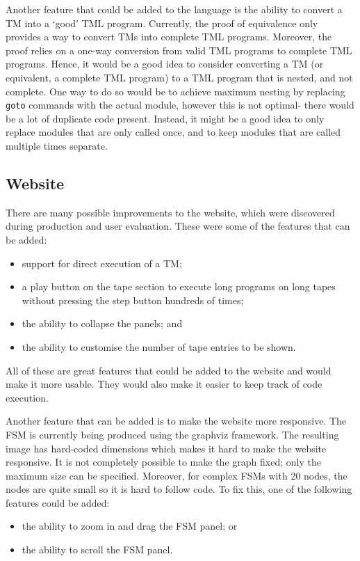 Another feature that could be added to the language is the ability to convert a TM into a `good' TML program. Currently, the proof of equivalence only provides a way to convert TMs into complete TML programs. Moreover, the proof relies on a one-way conversion from valid TML programs to complete TML programs. Hence, it would be a good idea to consider converting a TM (or equivalent, a complete TML program) to a TML program that is nested, and not complete. One way to do so would be to achieve maximum nesting by replacing \texttt{goto} commands with the actual module, however this is not optimal- there would be a lot of duplicate code present. Instead, it might be a good idea to only replace modules that are only called once, and to keep modules that are called multiple times separate. 

 \subsection{Website}
There are many possible improvements to the website, which were discovered during production and user evaluation. These were some of the features that can be added:
\begin{itemize}
    \item support for direct execution of a TM;
    \item a play button on the tape section to execute long programs on long tapes without pressing the step button hundreds of times;
    \item the ability to collapse the panels; and
    \item the ability to customise the number of tape entries to be shown.
\end{itemize}
All of these are great features that could be added to the website and would make it more usable. They would also make it easier to keep track of code execution. 

Another feature that can be added is to make the website more responsive. The FSM is currently being produced using the graphviz framework. The resulting image has hard-coded dimensions which makes it hard to make the website responsive. It is not completely possible to make the graph fixed; only the maximum size can be specified. Moreover, for complex FSMs with 20 nodes, the nodes are quite small so it is hard to follow code. To fix this, one of the following features could be added:
\begin{itemize}
    \item the ability to zoom in and drag the FSM panel; or
    \item the ability to scroll the FSM panel.
\end{itemize}


